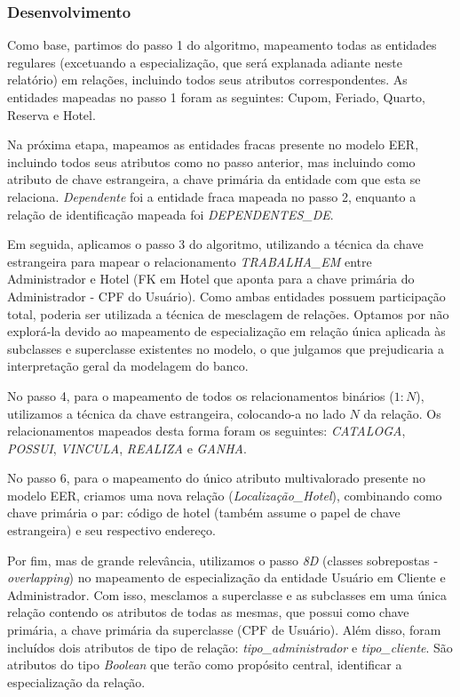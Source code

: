 \documentclass[a4paper, 12pt]{article}
\begin{document}
\subsubsection{Desenvolvimento}

Como base, partimos do passo 1 do algoritmo, mapeamento todas as entidades regulares (excetuando a especialização, que será explanada adiante neste relatório) em relações, incluindo todos seus atributos correspondentes. As entidades mapeadas no passo 1 foram as seguintes: Cupom, Feriado, Quarto, Reserva e Hotel.

Na próxima etapa, mapeamos as entidades fracas presente no modelo EER, incluindo todos seus atributos como no passo anterior, mas incluindo como atributo de chave estrangeira, a chave primária da entidade com que esta se relaciona. \emph{Dependente} foi a entidade fraca mapeada no passo 2, enquanto a relação de identificação mapeada foi \emph{DEPENDENTES\_DE}.

Em seguida, aplicamos o passo 3 do algoritmo, utilizando a técnica da chave estrangeira para mapear o relacionamento \emph{TRABALHA\_EM} entre Administrador e Hotel (FK em Hotel que aponta para a chave primária do Administrador - CPF do Usuário). Como ambas entidades possuem participação total, poderia ser utilizada a técnica de mesclagem de relações. Optamos por não explorá-la devido ao mapeamento de especialização em relação única aplicada às subclasses e superclasse existentes no modelo, o que julgamos que prejudicaria a interpretação geral da modelagem do banco.

No passo 4, para o mapeamento de todos os relacionamentos binários (\(1:N\)), utilizamos a técnica da chave estrangeira, colocando-a no lado \(N\) da relação. Os relacionamentos mapeados desta forma foram os seguintes: \emph{CATALOGA}, \emph{POSSUI}, \emph{VINCULA}, \emph{REALIZA} e \emph{GANHA}.

No passo 6, para o mapeamento do único atributo multivalorado presente no modelo EER, criamos uma nova relação (\emph{Localização\_Hotel}), combinando como chave primária o par: código de hotel (também assume o papel de chave estrangeira) e seu respectivo endereço.

Por fim, mas de grande relevância, utilizamos o passo \emph{8D} (classes sobrepostas - \emph{overlapping}) no mapeamento de especialização da entidade Usuário em Cliente e Administrador. Com isso, mesclamos a superclasse e as subclasses em uma única relação contendo os atributos de todas as mesmas, que possui como chave primária, a chave primária da superclasse (CPF de Usuário). Além disso, foram incluídos dois atributos de tipo de relação: \emph{tipo\_administrador} e \emph{tipo\_cliente}. São atributos do tipo \emph{Boolean} que terão como propósito central, identificar a especialização da relação.
\end{document}
